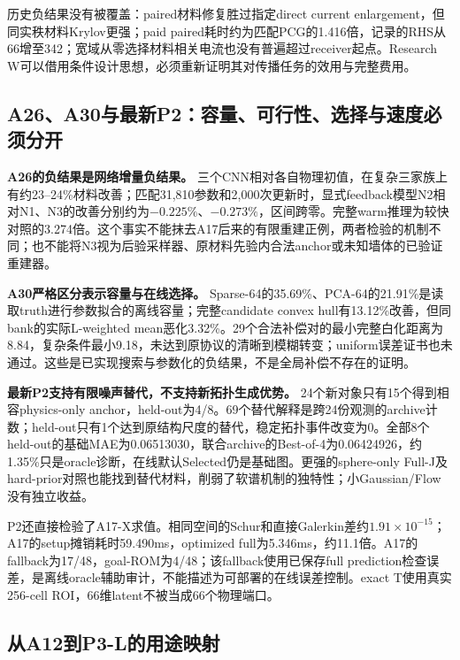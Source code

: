 历史负结果没有被覆盖：paired材料修复胜过指定direct current enlargement，但同实秩材料Krylov更强；paid paired耗时约为匹配PCG的1.416倍，记录的RHS从66增至342；宽域从零选择材料相关电流也没有普遍超过receiver起点。Research W可以借用条件设计思想，必须重新证明其对传播任务的效用与完整费用。\cite{R_A17}

\subsection{A26、A30与最新P2：容量、可行性、选择与速度必须分开}

\textbf{A26的负结果是网络增量负结果。}
三个CNN相对各自物理初值，在复杂三家族上有约23--24\%材料改善；匹配31,810参数和2,000次更新时，显式feedback模型N2相对N1、N3的改善分别约为\(-0.225\%\)、\(-0.273\%\)，区间跨零。完整warm推理为较快对照的3.274倍。这个事实不能抹去A17后来的有限重建正例，两者检验的机制不同；也不能将N3视为后验采样器、原材料先验内合法anchor或未知墙体的已验证重建器。\cite{R_A26}

\textbf{A30严格区分表示容量与在线选择。}
Sparse-64的35.69\%、PCA-64的21.91\%是读取truth进行参数拟合的离线容量；完整candidate convex hull有13.12\%改善，但同bank的实际L-weighted mean恶化3.32\%。29个合法补偿对的最小完整白化距离为8.84，复杂条件最小9.18，未达到原协议的清晰到模糊转变；uniform误差证书也未通过。这些是已实现搜索与参数化的负结果，不是全局补偿不存在的证明。\cite{R_A30}

\textbf{最新P2支持有限噪声替代，不支持新拓扑生成优势。}
24个新对象只有15个得到相容physics-only anchor，held-out为4/8。69个替代解释是跨24份观测的archive计数；held-out只有1个达到原结构尺度的替代，稳定拓扑事件改变为0。全部8个held-out的基础MAE为0.06513030，联合archive的Best-of-4为0.06424926，约1.35\%只是oracle诊断，在线默认Selected仍是基础图。更强的sphere-only Full-J及hard-prior对照也能找到替代材料，削弱了软谱机制的独特性；小Gaussian/Flow没有独立收益。\cite{R_P2}

P2还直接检验了A17-X求值。相同空间的Schur和直接Galerkin差约\(1.91\times10^{-15}\)；A17的setup摊销耗时59.490ms，optimized full为5.346ms，约11.1倍。A17的fallback为17/48，goal-ROM为4/48；该fallback使用已保存full prediction检查误差，是离线oracle辅助审计，不能描述为可部署的在线误差控制。exact T使用真实256-cell ROI，66维latent不被当成66个物理端口。\cite{R_P2}

\subsection{从A12到P3-L的用途映射}

